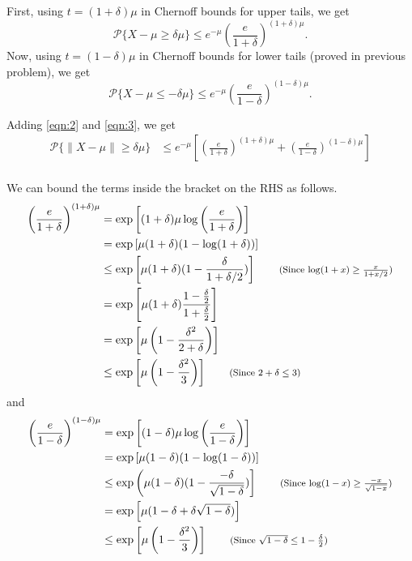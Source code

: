 \documentclass[11pt]{article}
\newenvironment{exercise}[2][Exercise]{\begin{trivlist}
\item[\hskip \labelsep {\bfseries #1}\hskip \labelsep {\bfseries #2.}]}{\end{trivlist}}
\newenvironment{solution}[1][Solution]{\begin{trivlist}
\item[\hskip \labelsep {\bfseries #1}\hskip \labelsep]}{\end{trivlist}}
\newcommand*{\annot}[1]{\tag*{\footnotesize{(#1)}}}
\begin{document}
\begin{exercise}{2.3.5}
\end{exercise}

\begin{solution}
First, using $t=(1+\delta)\mu$ in Chernoff bounds for upper tails, we get
\begin{equation}
\mathcal{P}\{ X-\mu \geq \delta\mu \} \leq e^{-\mu}\left( \frac{e}{1+\delta} \right)^{(1+\delta)\mu}.
\label{eqn:2}
\end{equation}
Now, using $t=(1-\delta)\mu$ in Chernoff bounds for lower tails (proved in previous problem), we get
\begin{equation}
\mathcal{P}\{ X-\mu \leq -\delta\mu \} \leq e^{-\mu}\left( \frac{e}{1-\delta} \right)^{(1-\delta)\mu}.
\label{eqn:3}
\end{equation}

Adding \ref{eqn:2} and \ref{eqn:3}, we get
\begin{align*}
\mathcal{P}\{ \lVert X-\mu \rVert \geq \delta\mu \} &\leq e^{-\mu}\left[ \left( \frac{e}{1+\delta} \right)^{(1+\delta)\mu} + \left( \frac{e}{1-\delta} \right)^{(1-\delta)\mu}\right] \\
\end{align*}

We can bound the terms inside the bracket on the RHS as follows.
\begin{align*}
\left( \frac{e}{1+\delta} \right)^{(1+\delta)\mu} &= \exp \left[ (1+\delta)\mu \log \left( \frac{e}{1+\delta} \right) \right] \\ 
	&= \exp \left[ \mu(1+\delta)(1 - \log(1+\delta)) \right] \\
	&\leq \exp \left[ \mu(1+\delta)(1 - \frac{\delta}{1+\delta/2}) \right] \annot{Since $\log(1+x) \geq \frac{x}{1+x/2}$}\\
	&= \exp \left[ \mu(1+\delta)\frac{1 - \frac{\delta}{2}}{1 + \frac{\delta}{2}} \right] \\
	&= \exp \left[ \mu\left(1 - \frac{\delta^2}{2+\delta} \right) \right] \\
	&\leq  \exp \left[ \mu\left(1 - \frac{\delta^2}{3} \right) \right] \annot{Since $2+\delta \leq 3$}\\
\end{align*}
and
\begin{align*}
\left( \frac{e}{1-\delta} \right)^{(1-\delta)\mu} &= \exp \left[ (1-\delta)\mu \log \left( \frac{e}{1-\delta} \right) \right] \\ 
	&= \exp \left[ \mu(1-\delta)(1 - \log(1-\delta)) \right] \\
	&\leq \exp \left( \mu(1-\delta)(1 - \frac{-\delta}{\sqrt{1-\delta}}) \right] \annot{Since $\log(1-x) \geq \frac{-x}{\sqrt{1-x}}$}\\
	&= \exp \left[ \mu (1 - \delta + \delta\sqrt{1-\delta}) \right] \\
	&\leq \exp \left[ \mu\left(1 - \frac{\delta^2}{3} \right) \right] \annot{Since $\sqrt{1-\delta}\leq 1- \frac{\delta}{2}$}\\
	\end{align*}


\end{solution}
\end{document}
